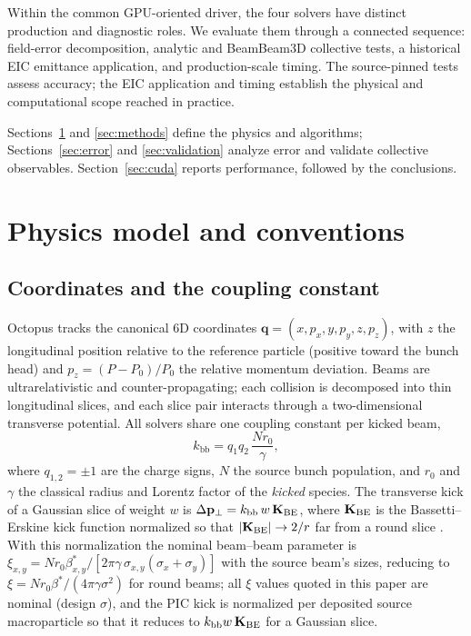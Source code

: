 \documentclass[a4paper,fleqn]{cas-sc}
\newcommand{\kbb}{k_{\mathrm{bb}}}
\begin{document}
Within the common GPU-oriented driver, the four solvers have distinct
production and diagnostic roles.  We evaluate them through a connected
sequence: field-error decomposition, analytic and BeamBeam3D collective tests,
a historical EIC emittance application, and production-scale timing.  The
source-pinned tests assess accuracy; the EIC application and timing establish
the physical and computational scope reached in practice.

Sections~\ref{sec:physics} and \ref{sec:methods} define the physics and
algorithms; Sections~\ref{sec:error} and \ref{sec:validation} analyze error and
validate collective observables.  Section~\ref{sec:cuda} reports performance,
followed by the conclusions.

\section{Physics model and conventions}
\label{sec:physics}

\subsection{Coordinates and the coupling constant}
\label{sec:conventions}

Octopus tracks the canonical 6D coordinates $\mathbf q=(x,p_x,y,p_y,z,p_z)$,
with $z$ the longitudinal position relative to the reference particle
(positive toward the bunch head) and $p_z=(P-P_0)/P_0$ the relative momentum
deviation.  Beams are ultrarelativistic and counter-propagating; each
collision is decomposed into thin longitudinal slices, and each slice pair
interacts through a two-dimensional transverse potential.  All solvers share
one coupling constant per kicked beam,
\begin{equation}
  \kbb = q_1 q_2\, \frac{N r_0}{\gamma},
  \label{eq:kbb}
\end{equation}
where $q_{1,2}=\pm1$ are the charge signs, $N$ the source bunch population,
and $r_0$ and $\gamma$ the classical radius and Lorentz factor of the
\emph{kicked} species.  The transverse kick of a Gaussian slice of weight
$w$ is $\Delta\mathbf p_\perp = \kbb\, w\,\mathbf K_{\rm BE}$, where
$\mathbf K_{\rm BE}$ is the Bassetti--Erskine kick function normalized so
that $|\mathbf K_{\rm BE}|\to 2/r$ far from a round slice
\citep{BassettiErskine1980}.  With this
normalization the nominal beam--beam parameter is
$\xi_{x,y} = N r_0 \beta^*_{x,y}/[2\pi\gamma\,\sigma_{x,y}(\sigma_x+\sigma_y)]$
with the source beam's sizes, reducing to
$\xi = N r_0 \beta^*/(4\pi\gamma\sigma^2)$ for round beams; all $\xi$
values quoted in this paper are nominal (design $\sigma$), and the PIC kick is normalized per
deposited source macroparticle so that it reduces to
$\kbb w\,\mathbf K_{\rm BE}$ for a Gaussian slice.
\end{document}
